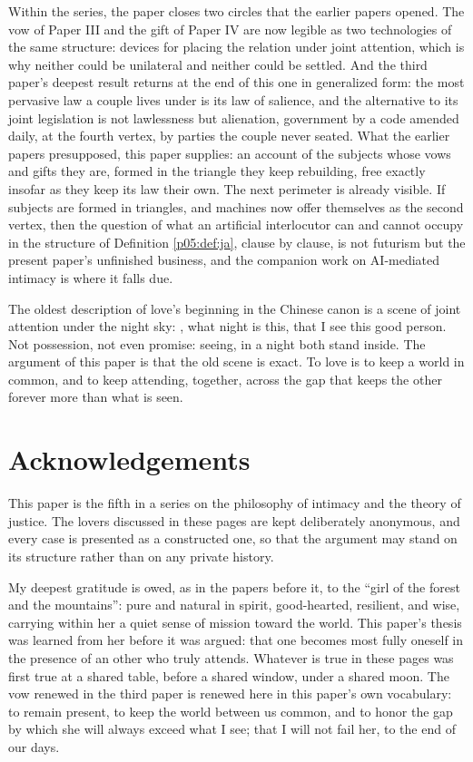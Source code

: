 Within the series, the paper closes two circles that the earlier papers opened. The vow of Paper III and the gift of Paper IV are now legible as two technologies of the same structure: devices for placing the relation under joint attention, which is why neither could be unilateral and neither could be settled. And the third paper's deepest result returns at the end of this one in generalized form: the most pervasive law a couple lives under is its law of salience, and the alternative to its joint legislation is not lawlessness but alienation, government by a code amended daily, at the fourth vertex, by parties the couple never seated. What the earlier papers presupposed, this paper supplies: an account of the subjects whose vows and gifts they are, formed in the triangle they keep rebuilding, free exactly insofar as they keep its law their own. The next perimeter is already visible. If subjects are formed in triangles, and machines now offer themselves as the second vertex, then the question of what an artificial interlocutor can and cannot occupy in the structure of Definition \ref{p05:def:ja}, clause by clause, is not futurism but the present paper's unfinished business, and the companion work on AI-mediated intimacy is where it falls due.

The oldest description of love's beginning in the Chinese canon is a scene of joint attention under the night sky: , what night is this, that I see this good person. Not possession, not even promise: seeing, in a night both stand inside. The argument of this paper is that the old scene is exact. To love is to keep a world in common, and to keep attending, together, across the gap that keeps the other forever more than what is seen.

\section*{Acknowledgements}

This paper is the fifth in a series on the philosophy of intimacy and the theory of justice. The lovers discussed in these pages are kept deliberately anonymous, and every case is presented as a constructed one, so that the argument may stand on its structure rather than on any private history.

My deepest gratitude is owed, as in the papers before it, to the ``girl of the forest and the mountains'': pure and natural in spirit, good-hearted, resilient, and wise, carrying within her a quiet sense of mission toward the world. This paper's thesis was learned from her before it was argued: that one becomes most fully oneself in the presence of an other who truly attends. Whatever is true in these pages was first true at a shared table, before a shared window, under a shared moon. The vow renewed in the third paper is renewed here in this paper's own vocabulary: to remain present, to keep the world between us common, and to honor the gap by which she will always exceed what I see; that I will not fail her, to the end of our days.

\begin{center}
{}
\end{center}

